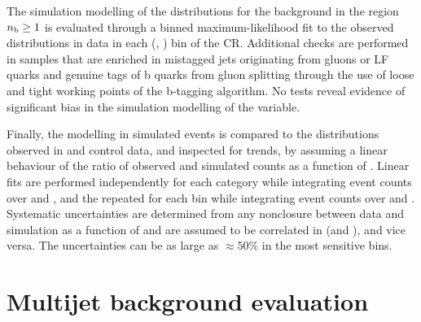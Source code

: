 The simulation modelling of the \nb distributions for the \znunuj
background in the region $n_{\text{b}} \geq 1$ is evaluated through a binned
maximum-likelihood fit to the observed \nb distributions in data in
each (\njet, \scalht) bin of the \mmj CR. Additional checks are
performed in \mmj samples that are enriched in mistagged jets
originating from gluons or LF quarks and genuine tags of b quarks from
gluon splitting through the use of loose and tight working points of
the b-tagging algorithm. No tests reveal evidence of significant bias
in the simulation modelling of the \nb variable.

Finally, the \mht modelling in simulated events is compared to the
distributions observed in \mj and \mmj control data, and inspected for
trends, by assuming a linear behaviour of the ratio of observed and
simulated counts as a function of \mht. Linear fits are performed
independently for each \njet category while integrating event counts
over \nb and \scalht, and the repeated for each \scalht bin while
integrating event counts over \njet and \nb. 
Systematic uncertainties are determined from any nonclosure between
data and simulation as a function of \njet and are assumed to be
correlated in \scalht (and \nb), and vice versa. The uncertainties can
be as large as ${\approx}50\%$ in the most sensitive \mht bins.


\section{Multijet background evaluation}
\label{sec:qcd}

